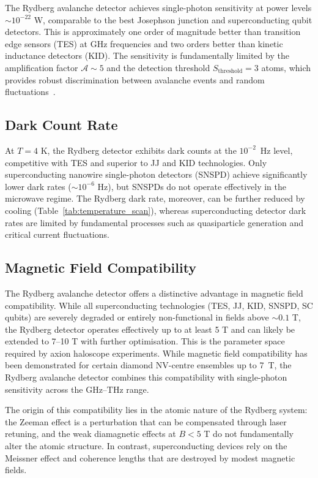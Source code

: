 The Rydberg avalanche detector achieves single-photon sensitivity at power levels $\sim 10^{-22}$ W, comparable to the best Josephson junction and superconducting qubit detectors. This is approximately one order of magnitude better than transition edge sensors (TES) at GHz frequencies and two orders better than kinetic inductance detectors (KID). The sensitivity is fundamentally limited by the amplification factor $\mathcal{A} \sim 5$ and the detection threshold $S_{\text{threshold}} = 3$ atoms, which provides robust discrimination between avalanche events and random fluctuations~\cite{Barredo2018}.

\subsection*{Dark Count Rate}

At $T = 4$ K, the Rydberg detector exhibits dark counts at the $10^{-2}$~Hz level, competitive with TES and superior to JJ and KID technologies. Only superconducting nanowire single-photon detectors (SNSPD) achieve significantly lower dark rates ($\sim 10^{-6}$ Hz), but SNSPDs do not operate effectively in the microwave regime. The Rydberg dark rate, moreover, can be further reduced by cooling (Table~\ref{tab:temperature_scan}), whereas superconducting detector dark rates are limited by fundamental processes such as quasiparticle generation and critical current fluctuations.

\subsection*{Magnetic Field Compatibility}

The Rydberg avalanche detector offers a distinctive advantage in magnetic field compatibility. While all superconducting technologies (TES, JJ, KID, SNSPD, SC qubits) are severely degraded or entirely non-functional in fields above $\sim 0.1$ T, the Rydberg detector operates effectively up to at least 5 T and can likely be extended to 7--10 T with further optimisation. This is the parameter space required by axion haloscope experiments. While magnetic field compatibility has been demonstrated for certain diamond NV-centre ensembles up to 7~T, the Rydberg avalanche detector combines this compatibility with single-photon sensitivity across the GHz--THz range.

The origin of this compatibility lies in the atomic nature of the Rydberg system: the Zeeman effect is a perturbation that can be compensated through laser retuning, and the weak diamagnetic effects at $B < 5$ T do not fundamentally alter the atomic structure. In contrast, superconducting devices rely on the Meissner effect and coherence lengths that are destroyed by modest magnetic fields.

